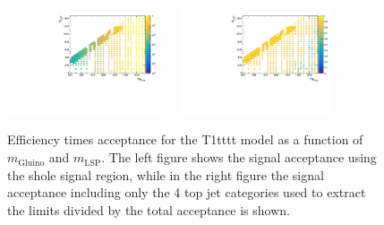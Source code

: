 \begin{figure}[h!]
  \begin{center}
    \includegraphics[width=0.4\textwidth]{figures/jetRanking/T1tttt/eff/T1tttt_merging_9_cats.pdf} ~~
    \includegraphics[width=0.4\textwidth]{figures/susyResults/T1tttt_doubleRatioAcceptance.pdf} \\
    \caption{
      Efficiency times acceptance for the T1tttt model as a function of $m_{\mathrm{Gluino}}$ and $m_{\mathrm{LSP}}$.
      The left figure shows the signal acceptance using the shole signal region, 
      while in the right figure the signal acceptance including only the 4 top jet categories used to extract the limits divided by the total acceptance is shown.
    }
    \label{fig:sig-eff-T1tttt}
  \end{center}
\end{figure}

